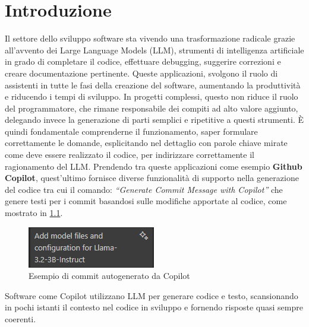 \documentclass[12pt,a4paper,openright,twoside]{book}
\begin{document}
\chapter{Introduzione}
\label{chap:introduction}
Il settore dello sviluppo software sta vivendo una trasformazione radicale grazie all’avvento dei Large Language Models (LLM),
strumenti di intelligenza artificiale in grado di completare il codice, effettuare debugging, suggerire correzioni e creare documentazione pertinente.
Queste applicazioni, svolgono il ruolo di assistenti in tutte le fasi della creazione del software, aumentando la produttività e riducendo i tempi di sviluppo.
In progetti complessi, questo non riduce il ruolo del programmatore, che rimane responsabile dei compiti ad alto valore aggiunto, delegando invece la generazione di parti semplici e ripetitive a questi strumenti.
\`E quindi fondamentale comprenderne il funzionamento, saper formulare correttamente le domande, esplicitando nel dettaglio con parole chiave mirate come deve essere realizzato il codice, per indirizzare correttamente il ragionamento del \ac{LLM}.
Prendendo tra queste applicazioni come esempio \textbf{Github Copilot}\cite{github-copilot}, quest'ultimo fornisce diverse funzionalità di supporto nella generazione del codice tra cui il comando: \emph{``Generate Commit Message with Copilot''}
che genere testi per i commit basandosi sulle modifiche apportate al codice, come mostrato in \cref{figura:Commit-Autogenerato}.
\begin{figure}[h]
    \centering
    \includegraphics[width=0.5\linewidth]{figures/commit.png}
    \caption{Esempio di commit autogenerato da Copilot}
    \label{figura:Commit-Autogenerato}
\end{figure}
Software come Copilot utilizzano LLM per generare codice e testo, scansionando in pochi istanti il contesto nel codice in sviluppo e fornendo risposte quasi sempre coerenti.
\end{document}
